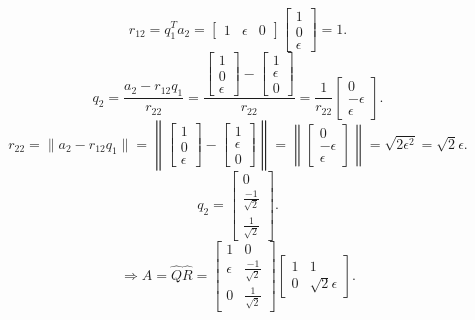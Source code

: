 \documentclass{article}
\begin{document}
\[r_{12}=q_1^Ta_2=\begin{bmatrix}1&\epsilon&0\end{bmatrix}\begin{bmatrix}1\\0\\\epsilon\end{bmatrix}=1.\]
\[q_2=\frac{a_2-r_{12}q_1}{r_{22}}=\frac{\begin{bmatrix}1\\0\\\epsilon\end{bmatrix}-\begin{bmatrix}1\\\epsilon\\0\end{bmatrix}}{r_{22}}=\frac{1}{r_{22}}\begin{bmatrix}0\\-\epsilon\\\epsilon\end{bmatrix}.\]
\[r_{22}=\lVert a_2-r_{12}q_1\rVert=\left\lVert\begin{bmatrix}1\\0\\\epsilon\end{bmatrix}-\begin{bmatrix}1\\\epsilon\\0\end{bmatrix}\right\rVert=\left\lVert\begin{bmatrix}0\\-\epsilon\\\epsilon\end{bmatrix}\right\rVert=\sqrt{2\epsilon^2}=\sqrt2\epsilon.\]
\[q_2=\begin{bmatrix}0\\\frac{-1}{\sqrt2}\\\frac{1}{\sqrt2}\end{bmatrix}.\]
\[\Rightarrow A=\hat{Q}\hat{R}=\begin{bmatrix}1&0\\\epsilon&\frac{-1}{\sqrt2}\\0&\frac{1}{\sqrt2}\end{bmatrix}\begin{bmatrix}1&1\\0&\sqrt2\epsilon\end{bmatrix}.\]
\end{document}
